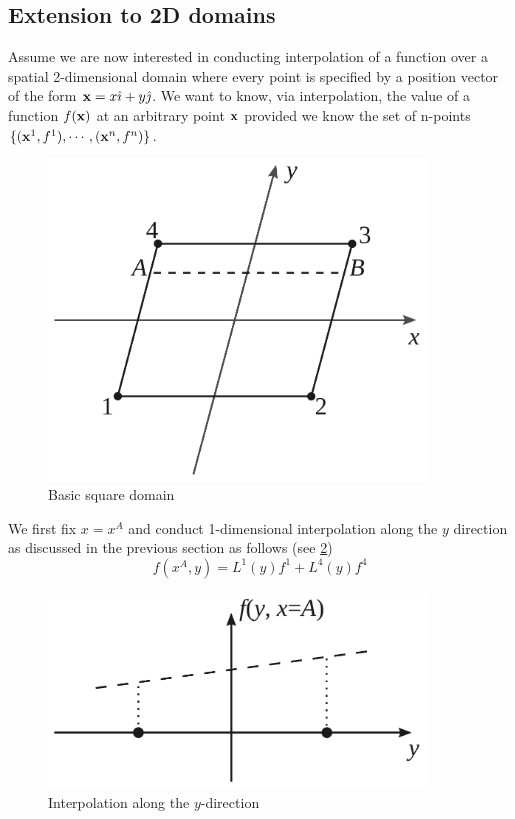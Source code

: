 \subsection*{Extension to 2D domains}
Assume we are now interested in conducting interpolation of a function over a spatial 2-dimensional domain where every point is specified by a position vector of the form $\vb{x} = x \hat{\imath} + y\hat{\jmath}$. We want to know, via interpolation, the value of a function $f(\vb{x})$ at an arbitrary point $\vb{x}$ provided we know the set of n-points $\{(\vb{x}^1, f^1),\cdots,(\vb{x}^n, f^n)\}$.
\begin{figure}[H]\label{fig:element}
  \centering
  \includegraphics[width=10cm]{element.pdf}
  \caption{Basic square domain}
\end{figure}

We first fix $x = x^A$ and conduct 1-dimensional interpolation along the $y$ direction as discussed in the previous section as follows (see \cref{fig:onedimn})
\[f(x^A,y) = L^1(y)f^1 + L^4(y)f^4\]

\begin{figure}[H]
\centering
\includegraphics[width=10cm]{inter1D.pdf}
\caption{Interpolation along the $y$-direction}
\label{fig:onedimn}
\end{figure}

